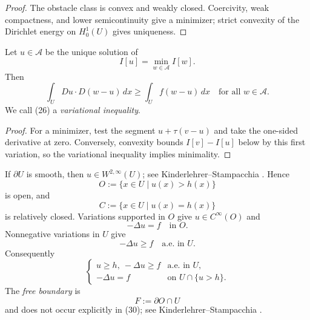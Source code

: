 \begin{proof}
\sketch The obstacle class is convex and weakly closed. Coercivity, weak compactness, and lower semicontinuity give a minimizer; strict convexity of the Dirichlet energy on $H_0^1(U)$ gives uniqueness.
\end{proof}

\begin{theorem}
\label{thm:variational-inequality-characterization}

Let $u \in \mathcal{A}$ be the unique solution of
\[
I[u] = \min_{w \in \mathcal{A}} I[w].
\]
Then
\[
\int_U Du \cdot D(w - u)\, dx \geq \int_U f(w - u)\, dx \quad \text{for all } w \in \mathcal{A}.
\tag{26}
\]
We call (26) a \textit{variational inequality}.
\end{theorem}

\begin{proof}
\sketch For a minimizer, test the segment $u+\tau(v-u)$ and take the one-sided derivative at zero. Conversely, convexity bounds $I[v]-I[u]$ below by this first variation, so the variational inequality implies minimality.
\end{proof}

\begin{remark}
\label{rem:obstacle-problem-free-boundary-interpretation}

If $\partial U$ is smooth, then $u\in W^{2,\infty}(U)$; see Kinderlehrer--Stampacchia \cite{KinderlehrerStampacchia1980}. Hence
\[
O := \{x \in U \mid u(x) > h(x)\}
\]
is open, and
\[
C := \{x \in U \mid u(x) = h(x)\}
\]
is relatively closed. Variations supported in $O$ give $u\in C^\infty(O)$ and
\[
-\Delta u = f \quad \text{in } O.
\tag{28}
\]
Nonnegative variations in $U$ give
\[
-\Delta u \geq f \quad \text{a.e. in } U.
\tag{29}
\]
Consequently
\[
\begin{cases}
u \geq h,\ -\Delta u \geq f & \text{a.e. in } U,\\
-\Delta u = f & \text{on } U \cap \{u > h\}.
\end{cases}
\tag{30}
\]
The \textit{free boundary} is
\[
F := \partial O \cap U
\]
and does not occur explicitly in (30); see Kinderlehrer--Stampacchia \cite{KinderlehrerStampacchia1980}.
\end{remark}

